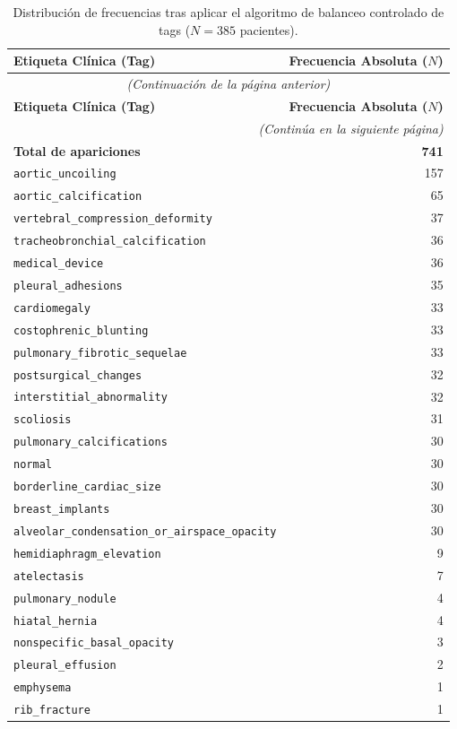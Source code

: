 \documentclass[../main.tex]{subfiles}
\begin{document}
\begin{longtable}{lr}
\hline
\textbf{Etiqueta Clínica (Tag)} & \textbf{Frecuencia Absoluta ($N$)} \\ \hline
\endfirsthead

\multicolumn{2}{c}{\textit{(Continuación de la página anterior)}} \\ \hline
\textbf{Etiqueta Clínica (Tag)} & \textbf{Frecuencia Absoluta ($N$)} \\ \hline
\endhead

\hline \multicolumn{2}{r}{\textit{(Continúa en la siguiente página)}} \\
\endfoot

\hline
\textbf{Total de apariciones} & \textbf{741} \\ \hline
\caption{Distribución de frecuencias tras aplicar el algoritmo de balanceo controlado de tags ($N = 385$ pacientes).}
\label{tab:apendice_tags_balanceados} 
\endlastfoot

\texttt{aortic\_uncoiling} & 157 \\
\texttt{aortic\_calcification} & 65 \\
\texttt{vertebral\_compression\_deformity} & 37 \\
\texttt{tracheobronchial\_calcification} & 36 \\
\texttt{medical\_device} & 36 \\
\texttt{pleural\_adhesions} & 35 \\
\texttt{cardiomegaly} & 33 \\
\texttt{costophrenic\_blunting} & 33 \\
\texttt{pulmonary\_fibrotic\_sequelae} & 33 \\
\texttt{postsurgical\_changes} & 32 \\
\texttt{interstitial\_abnormality} & 32 \\
\texttt{scoliosis} & 31 \\
\texttt{pulmonary\_calcifications} & 30 \\
\texttt{normal} & 30 \\
\texttt{borderline\_cardiac\_size} & 30 \\
\texttt{breast\_implants} & 30 \\
\texttt{alveolar\_condensation\_or\_airspace\_opacity} & 30 \\
\texttt{hemidiaphragm\_elevation} & 9 \\
\texttt{atelectasis} & 7 \\
\texttt{pulmonary\_nodule} & 4 \\
\texttt{hiatal\_hernia} & 4 \\
\texttt{nonspecific\_basal\_opacity} & 3 \\
\texttt{pleural\_effusion} & 2 \\
\texttt{emphysema} & 1 \\
\texttt{rib\_fracture} & 1 \\
\end{longtable}
\clearpage %
\end{document}
